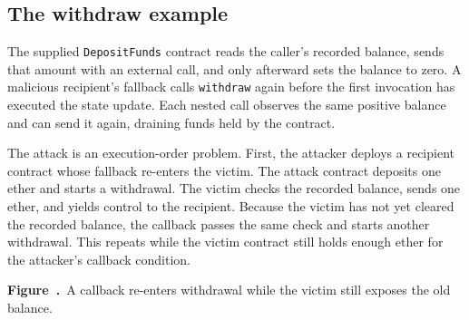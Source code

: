 \documentclass[11pt,a4paper]{article}
\numberwithin{figure}{section}
\newcommand{\diagramcaption}[1]{\par\smallskip\refstepcounter{figure}\begin{center}\small\textbf{Figure~\thefigure.}~#1\end{center}}
\begin{document}
\subsection{The withdraw example}
The supplied \texttt{DepositFunds} contract reads the caller's recorded balance, sends that amount with an external call, and only afterward sets the balance to zero. A malicious recipient's fallback calls \texttt{withdraw} again before the first invocation has executed the state update. Each nested call observes the same positive balance and can send it again, draining funds held by the contract.

The attack is an execution-order problem. First, the attacker deploys a recipient contract whose fallback re-enters the victim. The attack contract deposits one ether and starts a withdrawal. The victim checks the recorded balance, sends one ether, and yields control to the recipient. Because the victim has not yet cleared the recorded balance, the callback passes the same check and starts another withdrawal. This repeats while the victim contract still holds enough ether for the attacker's callback condition.

\begin{center}\end{center}
\diagramcaption{A callback re-enters withdrawal while the victim still exposes the old balance.}
\end{document}
